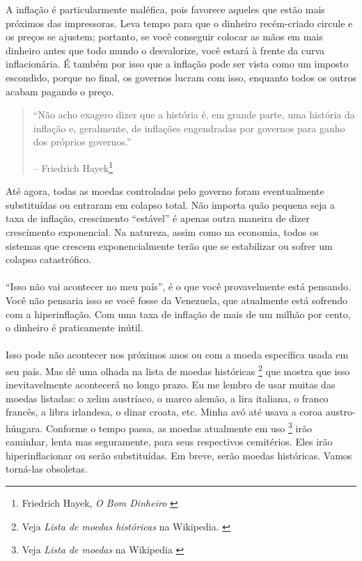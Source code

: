 A inflação é particularmente maléfica, pois favorece aqueles que estão mais próximos das impressoras. Leva tempo para que o dinheiro recém-criado circule e os preços se ajustem; portanto, se você conseguir colocar as mãos em mais dinheiro antes que todo mundo o desvalorize, você estará à frente da curva inflacionária. É também por isso que a inflação pode ser vista como um imposto escondido, porque no final, os governos lucram com isso, enquanto todos os outros acabam pagando o preço.

\begin{quotation}\begin{samepage}
\enquote{Não acho exagero dizer que a história é, em grande parte, uma história da inflação e, geralmente, de inflações engendradas por governos para ganho dos próprios governos.}
\begin{flushright} -- Friedrich Hayek\footnote{Friedrich Hayek, \textit{O Bom Dinheiro} \cite{hayek-good-money}}
\end{flushright}\end{samepage}\end{quotation}

Até agora, todas as moedas controladas pelo governo foram eventualmente substituídas ou entraram em colapso total. Não importa quão pequena seja a taxa de inflação, crescimento \enquote{estável} é apenas outra maneira de dizer crescimento exponencial. Na natureza, assim como na economia, todos os sistemas que crescem exponencialmente terão que se estabilizar ou sofrer um colapso catastrófico.

\paragraph{}
\enquote{Isso não vai acontecer no meu país}, é o que você provavelmente está pensando. Você não pensaria isso se você fosse da Venezuela, que atualmente está sofrendo com a hiperinflação. Com uma taxa de inflação de mais de um milhão por cento, o dinheiro é praticamente inútil. \cite{wiki:venezuela}

\paragraph{}
Isso pode não acontecer nos próximos anos ou com a moeda específica usada em seu país. Mas dê uma olhada na lista de moedas históricas \footnote{Veja \textit{Lista de moedas históricas} na Wikipedia. \cite{wiki:historical-currencies}} que mostra que isso inevitavelmente acontecerá no longo prazo. Eu me lembro de usar muitas das moedas listadas: o xelim austríaco, o marco alemão, a lira italiana, o franco francês, a libra irlandesa, o dinar croata, etc. Minha avó até usava a coroa austro-húngara. Conforme o tempo passa, as moedas atualmente em uso \footnote{Veja \textit{Lista de moedas} na Wikipedia \cite{wiki:list-of-currencies}} irão caminhar, lenta mas seguramente, para seus respectivos cemitérios. Eles irão hiperinflacionar ou serão substituídas. Em breve, serão moedas históricas. Vamos torná-las obsoletas.

